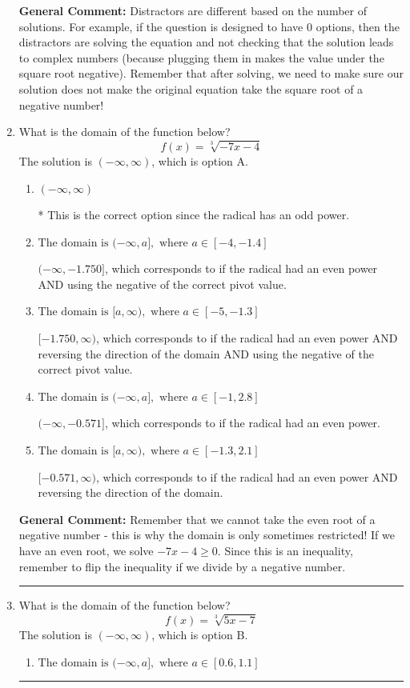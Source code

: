 \documentclass{extbook}[14pt]
\newcommand{\litem}[1]{\item #1

\rule{\textwidth}{0.4pt}}
\begin{document}
\begin{enumerate}
{\textbf{General Comment:} Distractors are different based on the number of solutions. For example, if the question is designed to have 0 options, then the distractors are solving the equation and not checking that the solution leads to complex numbers (because plugging them in makes the value under the square root negative). Remember that after solving, we need to make sure our solution does not make the original equation take the square root of a negative number!
}
\litem{
What is the domain of the function below?
\[ f(x) = \sqrt[3]{-7 x - 4} \]
The solution is \( (-\infty, \infty) \), which is option A.\begin{enumerate}[label=\Alph*.]
\item \( (-\infty, \infty) \)

* This is the correct option since the radical has an odd power.
\item \( \text{The domain is } (-\infty, a], \text{   where } a \in [-4, -1.4] \)

$(-\infty, -1.750]$, which corresponds to if the radical had an even power AND using the negative of the correct pivot value.
\item \( \text{The domain is } [a, \infty), \text{   where } a \in [-5, -1.3] \)

$[-1.750, \infty)$, which corresponds to if the radical had an even power AND reversing the direction of the domain AND using the negative of the correct pivot value.
\item \( \text{The domain is } (-\infty, a], \text{   where } a \in [-1, 2.8] \)

$(-\infty, -0.571]$, which corresponds to if the radical had an even power.
\item \( \text{The domain is } [a, \infty), \text{   where } a \in [-1.3, 2.1] \)

$[-0.571, \infty)$, which corresponds to if the radical had an even power AND reversing the direction of the domain.
\end{enumerate}

\textbf{General Comment:} Remember that we cannot take the even root of a negative number - this is why the domain is only sometimes restricted! If we have an even root, we solve $-7 x - 4 \geq 0$. Since this is an inequality, remember to flip the inequality if we divide by a negative number.
}
\litem{
What is the domain of the function below?
\[ f(x) = \sqrt[3]{5 x - 7} \]
The solution is \( (-\infty, \infty) \), which is option B.\begin{enumerate}[label=\Alph*.]
\item \( \text{The domain is } (-\infty, a], \text{   where } a \in [0.6, 1.1] \)


\end{enumerate}}
\end{enumerate}
\end{document}
